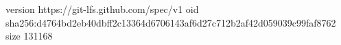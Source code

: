 version https://git-lfs.github.com/spec/v1
oid sha256:d4764bd2eb40dbff2c13364d6706143af6d27c712b2af42d059039c99faf8762
size 131168
